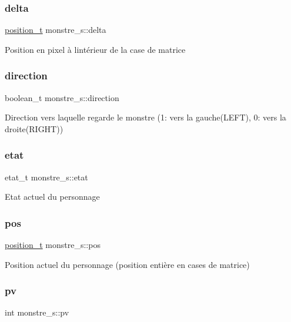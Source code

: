 \subsubsection{\texorpdfstring{delta}{delta}}
{\footnotesize\ttfamily \hyperlink{structposition__s}{position\+\_\+t} monstre\+\_\+s\+::delta}

Position en pixel à l\textquotesingle{}intérieur de la case de matrice \mbox{\label{structmonstre__s_aa1a2d6868b660addc5855614f1849540}} 
\subsubsection{\texorpdfstring{direction}{direction}}
{\footnotesize\ttfamily boolean\+\_\+t monstre\+\_\+s\+::direction}

Direction vers laquelle regarde le monstre (1\+: vers la gauche(\+L\+E\+F\+T), 0\+: vers la droite(\+R\+I\+G\+H\+T)) \mbox{\label{structmonstre__s_a38d270db8b7dd326f1e014eb3b72b740}} 
\subsubsection{\texorpdfstring{etat}{etat}}
{\footnotesize\ttfamily etat\+\_\+t monstre\+\_\+s\+::etat}

Etat actuel du personnage \mbox{\label{structmonstre__s_a972c2fb3087127d04bd3719d62c1030e}} 
\subsubsection{\texorpdfstring{pos}{pos}}
{\footnotesize\ttfamily \hyperlink{structposition__s}{position\+\_\+t} monstre\+\_\+s\+::pos}

Position actuel du personnage (position entière en cases de matrice) \mbox{\label{structmonstre__s_a1e26c0e85b90352f9496f331ec74e98d}} 
\subsubsection{\texorpdfstring{pv}{pv}}
{\footnotesize\ttfamily int monstre\+\_\+s\+::pv}

